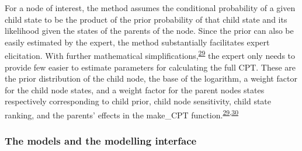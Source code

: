 \documentclass[11pt,preprint]{article}
\begin{document}
For a node of interest, the method assumes the conditional probability
of a given child state to be the product of the prior probability of
that child state and its likelihood given the states of the parents of
the node. Since the prior can also be easily estimated by the expert,
the method substantially facilitates expert elicitation. With further
mathematical
simplifications,\textsuperscript{\protect\hyperlink{ref-Hansson_and_Sjokvist_2013}{29}}
the expert only needs to provide few easier to estimate parameters for
calculating the full CPT. These are the prior distribution of the child
node, the base of the logarithm, a weight factor for the child node
states, and a weight factor for the parent nodes states respectively
corresponding to child prior, child node sensitivity, child state
ranking, and the parents' effects in the make\_CPT
function.\textsuperscript{\protect\hyperlink{ref-Hansson_and_Sjokvist_2013}{29},\protect\hyperlink{ref-Luedeling_and_Goehring_2018}{30}}

\hypertarget{the-models-and-the-modelling-interface}{%
\subsubsection{The models and the modelling
interface}\label{the-models-and-the-modelling-interface}}
\end{document}

